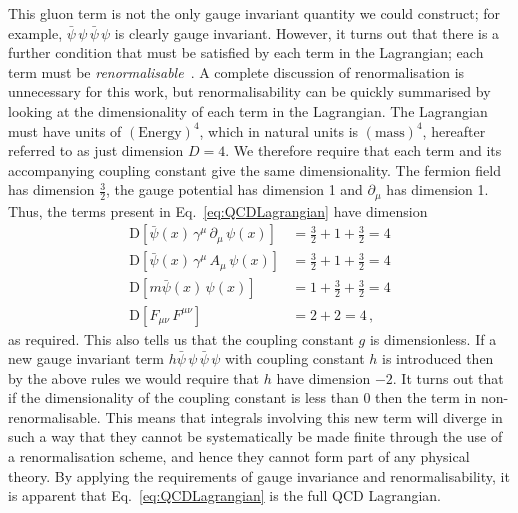 This gluon term is not the only gauge invariant quantity we could construct; for example, $\bar{\psi}\,\psi\,\bar{\psi}\,\psi$ is clearly gauge invariant. However, it turns out that there is a further condition that must be satisfied by each term in the Lagrangian; each term must be \textit{renormalisable}~\cite{peskin2018introduction}. A complete discussion of renormalisation is unnecessary for this work, but renormalisability can be quickly summarised by looking at the dimensionality of each term in the Lagrangian. The Lagrangian must have units of $(\text{Energy})^4$, which in natural units is $(\text{mass})^4$,  hereafter referred to as just dimension $D=4$. We therefore require that each term and its accompanying coupling constant give the same dimensionality. The fermion field has dimension $\frac{3}{2}$, the gauge potential has dimension 1 and $\partial_\mu$ has dimension 1. Thus, the terms present in Eq.~\eqref{eq:QCDLagrangian} have dimension
%
\begin{align*}
\text{D}[\bar{\psi}(x)\,\gamma^\mu\,\partial_\mu\,\psi(x)]&=\frac{3}{2}+1+\frac{3}{2}=4\\
\text{D}[\bar{\psi}(x)\,\gamma^\mu\,A_\mu\,\psi(x)]&=\frac{3}{2}+1+\frac{3}{2}=4\\
\text{D}[m\bar{\psi}(x)\,\psi(x)]&=1+\frac{3}{2}+\frac{3}{2}=4\\
\text{D}[F_{\mu\nu}\,F^{\mu\nu}] &= 2+2=4\, ,
\end{align*}
%
as required. This also tells us that the coupling constant $g$ is dimensionless. If a new gauge invariant term $h\bar{\psi}\,\psi\,\bar{\psi}\,\psi$ with coupling constant $h$ is introduced then by the above rules we would require that $h$ have dimension $-2$. It turns out that if the dimensionality of the coupling constant is less than 0 then the term in non-renormalisable. This means that integrals involving this new term will diverge in such a way that they cannot be systematically be made finite through the use of a renormalisation scheme, and hence they cannot form part of any physical theory. By applying the requirements of gauge invariance and renormalisability, it is apparent that Eq.~\eqref{eq:QCDLagrangian} is the full QCD Lagrangian.

